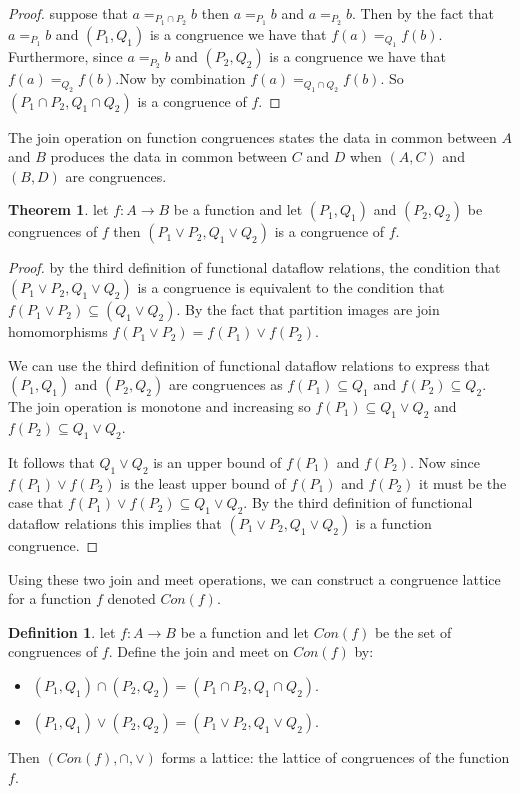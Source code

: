 \documentclass[a4paper,11pt, notitlepage]{report}
\theoremstyle{definition}
\newtheorem{definition}{Definition}[section]
\newtheorem{theorem}{Theorem}[section]
\begin{document}
\begin{proof}
suppose that $a =_{P_1 \cap P_2} b$ then $a =_{P_1} b$ and $a =_{P_2} b$. Then by the fact that $a =_{P_1} b$ and $(P_1, Q_1)$ is a congruence we have that $f(a) =_{Q_1} f(b)$. Furthermore, since $a =_{P_2} b$ and $(P_2,Q _2)$ is a congruence we have that $f(a) =_{Q_2} f(b)$.Now by combination $f(a) =_{Q_1 \cap Q_2} f(b)$. So $(P_1 \cap P_2, Q_1 \cap Q_2)$ is a congruence of $f$.
\end{proof}

The join operation on function congruences states the data in common between $A$ and $B$ produces the data in common between $C$ and $D$ when $(A,C)$ and $(B,D)$ are congruences.

\begin{theorem}
let $f: A \to B$ be a function and let $(P_1, Q_1)$ and $(P_2, Q_2)$ be congruences of $f$ then $(P_1 \vee P_2, Q_1 \vee Q_2)$ is a congruence of $f$.
\end{theorem}

\begin{proof}
by the third definition of functional dataflow relations, the condition that $(P_1 \vee P_2, Q_1 \vee Q_2)$ is a congruence is equivalent to the condition that $f(P_1 \vee P_2) \subseteq (Q_1 \vee Q_2)$. By the fact that partition images are join homomorphisms $f(P_1 \vee P_2) = f(P_1) \vee f(P_2)$.

We can use the third definition of functional dataflow relations to express that $(P_1,Q_1)$ and $(P_2,Q_2)$ are congruences as $f(P_1) \subseteq Q_1$ and $f(P_2) \subseteq Q_2$. The join operation is monotone and increasing so $f(P_1) \subseteq Q_1 \vee Q_2$ and $f(P_2) \subseteq Q_1 \vee Q_2$.

It follows that $Q_1 \vee Q_2$ is an upper bound of $f(P_1)$ and $f(P_2)$. Now since $f(P_1) \vee f(P_2)$ is the least upper bound of $f(P_1)$ and $f(P_2)$ it must be the case that $f(P_1) \vee f(P_2) \subseteq Q_1 \vee Q_2$. By the third definition of functional dataflow relations this implies that $(P_1 \vee P_2, Q_1 \vee Q_2)$ is a function congruence.
\end{proof}

Using these two join and meet operations, we can construct a congruence lattice for a function $f$ denoted $Con(f)$.

\begin{definition}
let $f: A \to B$ be a function and let $Con(f)$ be the set of congruences of $f$. Define the join and meet on $Con(f)$ by:
\begin{itemize}
 \item $(P_1,Q_1) \cap (P_2,Q_2) = (P_1 \cap P_2, Q_1 \cap Q_2)$.
 \item $(P_1,Q_1) \vee (P_2, Q_2) = (P_1 \vee P_2, Q_1 \vee Q_2)$.
\end{itemize}

Then $(Con(f), \cap, \vee)$ forms a lattice: the lattice of congruences of the function $f$.
\end{definition}
\end{document}
